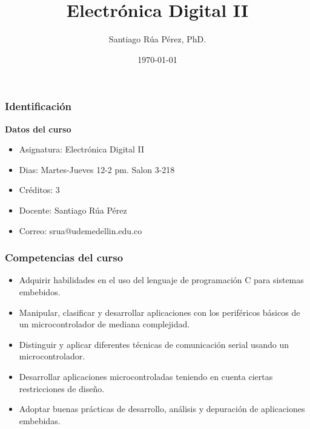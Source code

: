\documentclass[10.5pt,scale=1.0,t,aspectratio=169,hyperref={pdfpagelabels=false}]{beamer}
\title{Electrónica Digital II}
\author{Santiago Rúa Pérez, PhD.}
\date{\today}
\begin{document}
\justify
\renewcommand{\arraystretch}{2.0}


\begin{frame}
	\titlepage
\end{frame}



\begin{frame}
	\frametitle{Identificación}
	{\bf Datos del curso}
	\begin{itemize}
		\item Asignatura: Electrónica Digital II 
		\item Dias: Martes-Jueves 12-2 pm. Salon 3-218
		\item Créditos: 3
		\item Docente: Santiago Rúa Pérez
		\item Correo: srua@udemedellin.edu.co
	\end{itemize}
\end{frame}

\begin{frame}
	\frametitle{Competencias del curso}
	
	\begin{itemize}
		\justifying
		\item Adquirir habilidades en el uso del lenguaje de programación C para sistemas embebidos.
		\item Manipular, clasificar y desarrollar aplicaciones con los periféricos básicos de un microcontrolador de mediana complejidad.
		\item Distinguir y aplicar diferentes técnicas de comunicación serial usando un microcontrolador.
		\item Desarrollar aplicaciones microcontroladas teniendo en cuenta ciertas restricciones de diseño.
		\item Adoptar buenas prácticas de desarrollo, análisis y depuración de aplicaciones embebidas.
	\end{itemize}
\end{frame}
\end{document}
